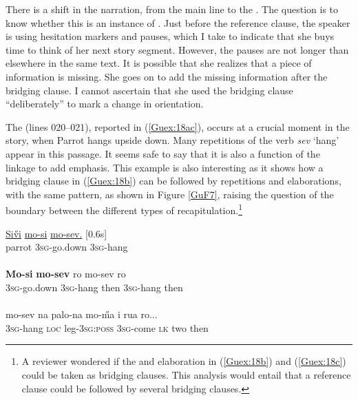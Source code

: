 \documentclass[output=paper]{LSP/langsci}
\begin{document}
There is a shift in the narration, from the main line to the . The question is to know whether this is an instance of . Just before the reference clause, the speaker is using hesitation markers and pauses, which I take to indicate that she buys time to think of her next story segment. However, the pauses are not longer than elsewhere in the same text. It is possible that she realizes that a piece of information is missing. She goes on to add the missing information after the bridging clause. I cannot ascertain that she used the bridging clause ``deliberately'' to mark a change in orientation. 

The  (lines 020--021), reported in (\ref{Guex:18ac}), occurs at a crucial moment in the story, when Parrot hangs upside down. Many repetitions of the verb \textit{sev} `hang' appear in this passage. It seems safe to say that it is also a function of the linkage to add emphasis. This example is also interesting as it shows how a bridging clause in (\ref{Guex:18b}) can be followed by repetitions and elaborations, with the same  pattern, as shown in Figure \ref{GuF7}, raising the question of the boundary between the different types of recapitulation.\footnote{A reviewer wondered if the  and elaboration in (\ref{Guex:18b}) and (\ref{Guex:18c}) could be taken as bridging clauses. This analysis would entail that a reference clause could be followed by several bridging clauses.}

\begin{exe}
\ex \label{Guex:18ac}
\begin{xlist}
\ex \label{Guex:18a}
\gll \underline{Si\H{v}i}  \underline{mo-si}           \underline{mo-sev.}           [0.6s]\\
parrot  \textsc{3sg}-go.down   \textsc{3sg}-hang \\
\glt {}\\
\ex \label{Guex:18b}
\gll \textbf{Mo-si}          \textbf{mo-sev}       ro              mo-sev       ro\\
\textsc{3sg}-go.down   \textsc{3sg}-hang   then  \textsc{3sg}-hang then\\
\glt {}\\
\ex \label{Guex:18c}
\gll   mo-sev    na     palo-na           mo-\H{m}a        i     rua   ro...\\     	       
\textsc{3sg}-hang  \textsc{loc}    leg-\textsc{3sg:poss}   \textsc{3sg}-come  \textsc{lk}   two   then \\
\glt {} 
\end{xlist}
\end{exe}
\end{document}
